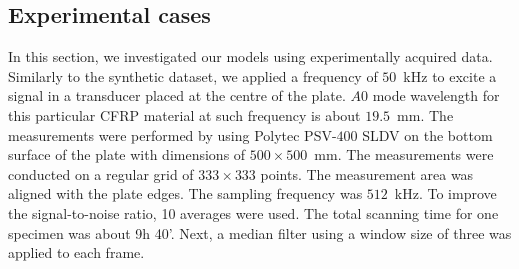 \begin{sloppypar}
	\subsection{Experimental cases}
	In this section, we investigated our models using experimentally acquired data.
	Similarly to the synthetic dataset, we applied a frequency of \(50\)~kHz to excite a signal in a transducer placed at the centre of the plate. 
	\(A0\) mode wavelength for this particular CFRP material at such frequency is about \(19.5\)~mm. 
	The measurements were performed by using Polytec PSV-\(400\) SLDV on the bottom surface of the plate with dimensions of \(500\times 500\)~mm. 
	The measurements were conducted on a regular grid of \(333\times333\) points. 
	The measurement area was aligned with the plate edges.
	The sampling frequency was \(512\)~kHz.
	To improve the signal-to-noise ratio, 10 averages were used.
	The total scanning time for one specimen was about 9h 40'.
	Next, a median filter using a window size of three was applied to each frame. 


\end{sloppypar}
